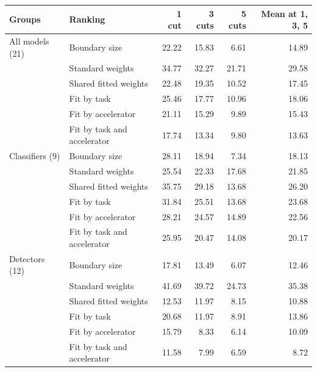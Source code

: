 \begin{tabular}{@{}llrrrr@{}}
\toprule
Groups & Ranking & 1 cut & 3 cuts & 5 cuts & Mean at 1, 3, 5 \\
\midrule
All models (21) & Boundary size & 22.22 & 15.83 & 6.61 & 14.89 \\
 & Standard weights & 34.77 & 32.27 & 21.71 & 29.58 \\
 & Shared fitted weights & 22.48 & 19.35 & 10.52 & 17.45 \\
 & Fit by task & 25.46 & 17.77 & 10.96 & 18.06 \\
 & Fit by accelerator & 21.11 & 15.29 & 9.89 & 15.43 \\
 & Fit by task and accelerator & 17.74 & 13.34 & 9.80 & 13.63 \\
\midrule
Classifiers (9) & Boundary size & 28.11 & 18.94 & 7.34 & 18.13 \\
 & Standard weights & 25.54 & 22.33 & 17.68 & 21.85 \\
 & Shared fitted weights & 35.75 & 29.18 & 13.68 & 26.20 \\
 & Fit by task & 31.84 & 25.51 & 13.68 & 23.68 \\
 & Fit by accelerator & 28.21 & 24.57 & 14.89 & 22.56 \\
 & Fit by task and accelerator & 25.95 & 20.47 & 14.08 & 20.17 \\
\midrule
Detectors (12) & Boundary size & 17.81 & 13.49 & 6.07 & 12.46 \\
 & Standard weights & 41.69 & 39.72 & 24.73 & 35.38 \\
 & Shared fitted weights & 12.53 & 11.97 & 8.15 & 10.88 \\
 & Fit by task & 20.68 & 11.97 & 8.91 & 13.86 \\
 & Fit by accelerator & 15.79 & 8.33 & 6.14 & 10.09 \\
 & Fit by task and accelerator & 11.58 & 7.99 & 6.59 & 8.72 \\
\bottomrule
\end{tabular}
